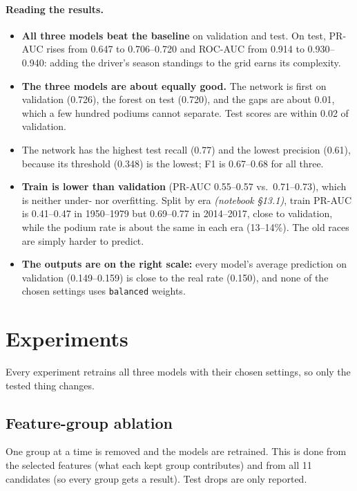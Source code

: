 \documentclass[11pt,a4paper]{article}
\newcommand{\code}[1]{\texttt{#1}}
\newcommand{\nb}[1]{\textit{(notebook \S#1)}}
\begin{document}
\paragraph{Reading the results.}
\begin{itemize}
\item \textbf{All three models beat the baseline} on validation and test. On test, PR-AUC rises from 0.647 to 0.706--0.720 and ROC-AUC from 0.914 to 0.930--0.940: adding the driver's season standings to the grid earns its complexity.
\item \textbf{The three models are about equally good.} The network is first on validation (0.726), the forest on test (0.720), and the gaps are about 0.01, which a few hundred podiums cannot separate. Test scores are within 0.02 of validation.
\item The network has the highest test recall (0.77) and the lowest precision (0.61), because its threshold (0.348) is the lowest; F1 is 0.67--0.68 for all three.
\item \textbf{Train is lower than validation} (PR-AUC 0.55--0.57 vs.\ 0.71--0.73), which is neither under- nor overfitting. Split by era \nb{13.1}, train PR-AUC is 0.41--0.47 in 1950--1979 but 0.69--0.77 in 2014--2017, close to validation, while the podium rate is about the same in each era (13--14\%). The old races are simply harder to predict.
\item \textbf{The outputs are on the right scale:} every model's average prediction on validation (0.149--0.159) is close to the real rate (0.150), and none of the chosen settings uses \code{balanced} weights.
\end{itemize}

\section{Experiments}

Every experiment retrains all three models with their chosen settings, so only the tested thing changes.

\subsection{Feature-group ablation}\label{sec:ablation}
One group at a time is removed and the models are retrained. This is done from the selected features (what each kept group contributes) and from all 11 candidates (so every group gets a result). Test drops are only reported.
\end{document}
